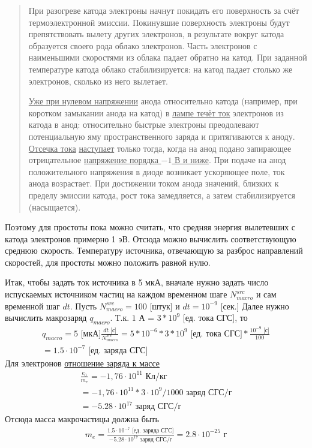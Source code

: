 \begin{quote}
При разогреве катода электроны начнут покидать его поверхность за счёт
термоэлектронной эмиссии. Покинувшие поверхность электроны будут
препятствовать вылету других электронов, в результате вокруг катода
образуется своего рода облако электронов. Часть электронов с
наименьшими скоростями из облака падает обратно на катод. При заданной
температуре катода облако стабилизируется: на катод падает столько же
электронов, сколько из него вылетает.

\underline{Уже при нулевом напряжении} анода относительно катода
(например, при коротком замыкании анода на катод) в \underline{лампе
течёт ток} электронов из катода в анод: относительно быстрые электроны
преодолевают потенциальную яму пространственного заряда и
притягиваются к аноду. \underline{Отсечка тока} \underline{наступает} только
тогда, когда на анод подано запирающее отрицательное
\underline{напряжение порядка $-1$ В и ниже}. При подаче на анод
положительного напряжения в диоде возникает ускоряющее поле, ток анода
возрастает. При достижении током анода значений, близких к пределу
эмиссии катода, рост тока замедляется, а затем стабилизируется
(насыщается).
\end{quote}

Поэтому для простоты пока можно считать, 
что средняя энергия вылетевших с катода электронов примерно 1 эВ.
Отсюда можно вычислить соответствующую среднюю скорость.
Температуру источника, отвечающую за разброс направлений скоростей, 
для простоты можно положить равной нулю. 


Итак, чтобы задать ток источника в 5 мкА, вначале нужно задать
число испускаемых источником частиц на каждом временном шаге 
$N_{macro}^{src}$ 
и сам временной шаг $dt$. 
Пусть $N_{macro}^{src} = 100$ [штук] и $dt = 10^{-9}$ [сек.]
Далее нужно вычислить макрозаряд $q_{macro}$. 
Т.к. $1$ А = $3 * 10^9$ [ед. тока СГС], то
\begin{gather}
   q_{macro} =  5 \mbox{ [мкА]} \frac{dt \mbox{ [с]} }{ N_{macro}^{src} }
   = 5 * 10^{-6} * 3 *10^{9} \mbox{ [ед. тока СГС]} * \frac{10^{-9} \mbox{ [с]} }{ 100 }
   \\
   = 1.5 \cdot 10^{-7} \mbox{ [ед. заряда СГС]}
\end{gather}
Для электронов \href{http://physics.nist.gov/cgi-bin/cuu/Value?esme}{отношение заряда к массе}
\begin{gather}
\frac{e_0}{m_e} = -1,76 \cdot 10^{11} \mbox{ Кл/кг} \\
= -1,76 \cdot 10^{11} * 3 \cdot 10^9 / 1000 \mbox{ заряд СГС/г} \\
= -5.28 \cdot 10^{17} \mbox{ заряд СГС/г} 
\end{gather}
Отсюда масса макрочастицы должна быть
\begin{gather}
m_e = \frac{1.5 \cdot 10^{-7} \mbox{ [ед. заряда СГС]}}{-5.28 \cdot 10^{17} \mbox{ заряд СГС/г}}
= 2.8 \cdot 10^{-25} \mbox{ г}
\end{gather}

